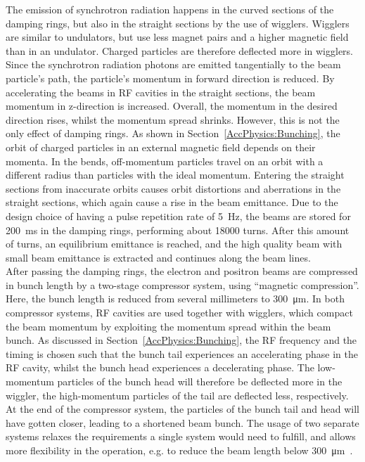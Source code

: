 The emission of synchrotron radiation happens in the curved sections of the damping rings, but also in the straight sections by the use of wigglers.
Wigglers are similar to undulators, but use less magnet pairs and a higher magnetic field than in an undulator.
Charged particles are therefore deflected more in wigglers.
Since the synchrotron radiation photons are emitted tangentially to the beam particle's path,
the particle's momentum in forward direction is reduced.
By accelerating the beams in RF cavities in the straight sections, the beam momentum in z-direction is increased.
Overall, the momentum in the desired direction rises, whilst the momentum spread shrinks.
However, this is not the only effect of damping rings.
As shown in Section~\ref{AccPhysics:Bunching}, the orbit of charged particles in an external magnetic field depends on their momenta.
In the bends, off-momentum particles travel on an orbit with a different radius than particles with the ideal momentum.
Entering the straight sections from inaccurate  orbits causes orbit distortions and aberrations in the straight sections, which again cause a rise in the beam emittance.
Due to the design choice of having a pulse repetition rate of \SI{5}{\hertz}, the beams are stored for \SI{200}{\milli\second} in the damping rings, performing about \num{18000} turns.
After this amount of turns, an equilibrium emittance is reached, and the high quality beam with small beam emittance is extracted and continues along the beam lines. \\
After passing the damping rings, the electron and positron beams are compressed in bunch length by a two-stage compressor system, using ``magnetic compression''.
Here, the bunch length is reduced from several millimeters to \SI{300}{\micro\meter}.
In both compressor systems, RF cavities are used together with wigglers, which compact the beam momentum by exploiting the momentum spread within the beam bunch.
As discussed in Section~\ref{AccPhysics:Bunching}, the RF frequency and the timing is chosen such that the bunch tail experiences an accelerating phase in the RF cavity, whilst the bunch head experiences a decelerating phase.
The low-momentum particles of the bunch head will therefore be deflected more in the wiggler, the high-momentum particles of the tail are deflected less, respectively.
At the end of the compressor system, the particles of the bunch tail and head will have gotten closer, leading to a shortened beam bunch. 
The usage of two separate systems relaxes the requirements a single system would need to fulfill,  and allows more flexibility in the operation, e.g. to reduce the beam length below \SI{300}{\micro\meter}~\cite[p. 124]{TDR32}.\\
